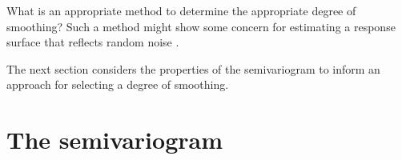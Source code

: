 \documentclass[phdcss]{SDSUThesis}
\begin{document}
What is an appropriate method to determine the appropriate degree of smoothing? Such a method might show some concern for estimating a response surface that reflects random noise \cite{matheron-1967}. 

The next section considers the properties of the semivariogram to inform an approach for selecting a degree of smoothing.








\clearpage

\section{The semivariogram}
 
\end{document}
